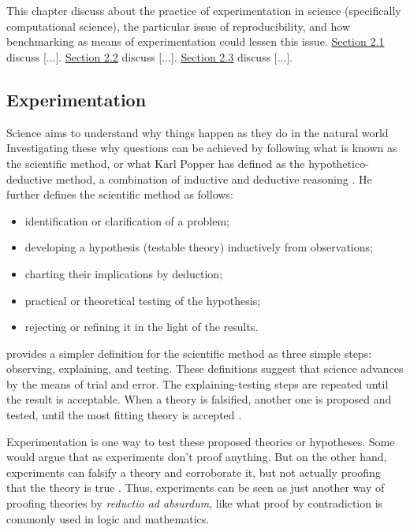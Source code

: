 \chapter{\babDua}

This chapter discuss about the practice of experimentation in science (specifically computational science), the particular issue of reproducibility, and how benchmarking as means of experimentation could lessen this issue.
\hyperref[sec:experimentation]{Section 2.1} discuss [...].
\hyperref[sec:reproducibleBenchmarks]{Section 2.2} discuss [...].
\hyperref[sec:idealBenchmarkingTool]{Section 2.3} discuss [...].

\section{Experimentation}
\label{sec:experimentation}

Science aims to understand why things happen as they do in the natural world \citep{careyBeginnerGuideScientific2012}
Investigating these why questions can be achieved by following what is known as the scientific method, or what Karl Popper has defined as the hypothetico-deductive method, a combination of inductive and deductive reasoning \citep{wallimanResearchMethodsBasics2010a}.
He further defines the scientific method as follows:
\begin{itemize}[noitemsep]
	\item identification or clarification of a problem;
	\item developing a hypothesis (testable theory) inductively from observations;
	\item charting their implications by deduction;
	\item practical or theoretical testing of the hypothesis;
	\item rejecting or refining it in the light of the results.
\end{itemize}

\citet{careyBeginnerGuideScientific2012} provides a simpler definition for the scientific method as three simple steps: observing, explaining, and testing.
These definitions suggest that science advances by the means of trial and error.
The explaining-testing steps are repeated until the result is acceptable.
When a theory is falsified, another one is proposed and tested, until the most fitting theory is accepted \citep{wallimanResearchMethodsBasics2010a}.

Experimentation is one way to test these proposed theories or hypotheses.
Some would argue that as experiments don't proof anything.
But on the other hand, experiments can falsify a theory and corroborate it, but not actually proofing that the theory is true \citep{tichyShouldComputerScientists1998}.
Thus, experiments can be seen as just another way of proofing theories by \textit{reductio ad absurdum}, like what proof by contradiction is commonly used in logic and mathematics.

